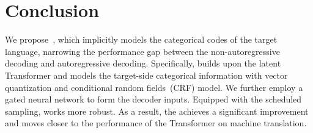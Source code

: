 

\maketitle















\appendix



\section{Conclusion}
We propose~\method, which implicitly models the categorical codes of the target language, narrowing the performance gap between the non-autoregressive decoding and autoregressive decoding.
Specifically, \method builds upon the latent Transformer and models the target-side categorical information with vector quantization and conditional random fields~(CRF) model. 
We further employ a gated neural network to form the decoder inputs. Equipped with the scheduled sampling, \method works more robust.
As a result, the \method achieves a significant improvement and moves closer to the performance of the Transformer on machine translation.
